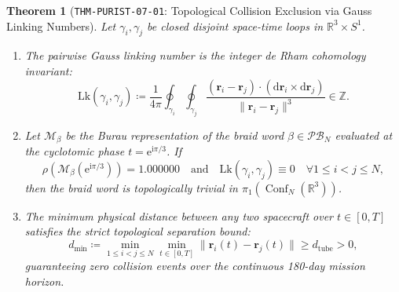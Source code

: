 \documentclass[11pt,a4paper,reqno]{article}
\theoremstyle{plain}
\newtheorem{theorem}{Theorem}[section]
\theoremstyle{definition}
\theoremstyle{remark}
\numberwithin{equation}{section}
\newcommand{\R}{\mathbb{R}}
\newcommand{\Z}{\mathbb{Z}}
\begin{document}
\begin{theorem}[\texttt{THM-PURIST-07-01}: Topological Collision Exclusion via Gauss Linking Numbers]
\label{thm:gauss_linking_purist}
Let $\gamma_i, \gamma_j$ be closed disjoint space-time loops in $\R^3 \times S^1$.
\begin{enumerate}[label=\textbf{(\roman*)}, leftmargin=2.0em]
  \item The pairwise Gauss linking number is the integer de Rham cohomology invariant:
  \begin{equation}\label{eq:gauss_linking_integral_purist}
    \mathrm{Lk}(\gamma_i, \gamma_j) \coloneqq \frac{1}{4\pi} \oint_{\gamma_i} \oint_{\gamma_j} \frac{(\mathbf{r}_i - \mathbf{r}_j) \cdot (\mathrm{d}\mathbf{r}_i \times \mathrm{d}\mathbf{r}_j)}{\|\mathbf{r}_i - \mathbf{r}_j\|^3} \in \Z.
  \end{equation}
  \item Let $\mathcal{M}_\beta$ be the Burau representation of the braid word $\beta \in \mathcal{P}\mathcal{B}_N$ evaluated at the cyclotomic phase $t = \mathrm{e}^{\mathrm{i}\pi/3}$. If
  \begin{equation}\label{eq:cyclotomic_spectral_radius}
    \rho\left(\mathcal{M}_\beta(\mathrm{e}^{\mathrm{i}\pi/3})\right) = 1.000000 \quad \text{and} \quad \mathrm{Lk}(\gamma_i, \gamma_j) \equiv 0 \quad \forall 1 \le i < j \le N,
  \end{equation}
  then the braid word is topologically trivial in $\pi_1(\operatorname{Conf}_N(\R^3))$.
  \item The minimum physical distance between any two spacecraft over $t \in [0, T]$ satisfies the strict topological separation bound:
  \begin{equation}\label{eq:topological_separation_bound}
    d_{\min} \coloneqq \min_{1 \le i < j \le N} \min_{t \in [0, T]} \|\mathbf{r}_i(t) - \mathbf{r}_j(t)\| \ge d_{\mathrm{tube}} > 0,
  \end{equation}
  guaranteeing zero collision events over the continuous 180-day mission horizon.
\end{enumerate}
\end{theorem}
\end{document}
